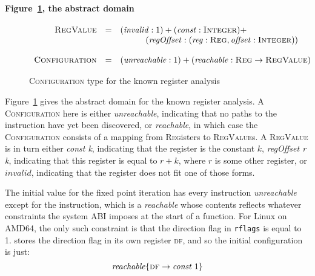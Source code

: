 
\paragraph{Figure~\ref{fig:known_regs:configuration}, the abstract domain}

\begin{figure}
  \begin{displaymath}
    \begin{array}{rcl}
      \textsc{RegValue} & = & (\mathit{invalid}:1) + (\mathit{const}:\textsc{Integer}) + \\
                        &   & {\quad\quad\quad} (\mathit{regOffset}:\left(\mathit{reg}: \textsc{Reg}, \mathit{offset}: \textsc{Integer}\right)) \\
      \\
      \textsc{Configuration} & = & (\mathit{unreachable}:1) + (\mathit{reachable}: \textsc{Reg} \rightarrow \textsc{RegValue})\\
    \end{array}
  \end{displaymath}
  \caption{\textsc{Configuration} type for the known register analysis}
  \label{fig:known_regs:configuration}
\end{figure}

Figure~\ref{fig:known_regs:configuration} gives the abstract domain
for the known register analysis.  A \textsc{Configuration} here is
either \textit{unreachable}, indicating that no paths to the
instruction have yet been discovered, or \textit{reachable}, in which
case the \textsc{Configuration} consists of a mapping from
\textsc{Reg}isters to \textsc{RegValue}s.  A \textsc{RegValue} is in
turn either \textit{const k}, indicating that the register is the
constant $k$, \textit{regOffset r k}, indicating that this register is
equal to $r + k$, where $r$ is some other register, or
$\mathit{invalid}$, indicating that the register does not fit one of
those forms.

The initial value for the fixed point iteration has every instruction
\textit{unreachable} except for the 
instruction, which is a \textit{reachable} whose contents reflects
whatever constraints the system ABI imposes at the start of a
function.  For Linux on AMD64, the only such constraint is that the
direction flag in \texttt{rflags} is equal to 1.  {\Implementation}
stores the direction flag in its own register \textsc{df}, and so the initial
configuration is just:
\begin{displaymath}
  \mathit{reachable} \{ \textsc{df} \rightarrow \textit{const }1 \}
\end{displaymath}

